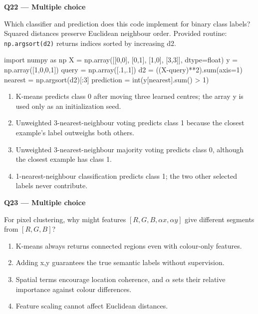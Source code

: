 \documentclass[11pt,a4paper]{article}
\begin{document}
\begin{minipage}{\linewidth}
\textbf{Q22 — Multiple choice}\par\smallskip
Which classifier and prediction does this code implement for binary class labels? Squared distances preserve Euclidean neighbour order. Provided routine: \texttt{np.argsort(d2)} returns indices sorted by increasing d2.


\begin{Code}
import numpy as np
X = np.array([[0,0], [0,1], [1,0], [3,3]], dtype=float)
y = np.array([1,0,0,1])
query = np.array([.1,.1])
d2 = ((X-query)**2).sum(axis=1)
nearest = np.argsort(d2)[:3]
prediction = int(y[nearest].sum() > 1)
\end{Code}

\begin{enumerate}[label=\textbf{\Alph*.}]
\item K-means predicts class 0 after moving three learned centres; the array y is used only as an initialization seed.
\item Unweighted 3-nearest-neighbour voting predicts class 1 because the closest example's label outweighs both others.
\item Unweighted 3-nearest-neighbour majority voting predicts class 0,\allowbreak{} although the closest example has class 1.
\item 1-nearest-neighbour classification predicts class 1; the two other selected labels never contribute.
\end{enumerate}
\end{minipage}
\par\vspace{12pt}
\begin{minipage}{\linewidth}
\textbf{Q23 — Multiple choice}\par\smallskip
For pixel clustering,\allowbreak{} why might features \([R,G,B,\alpha x,\alpha y]\) give different segments from \([R,G,B]\)?
\begin{enumerate}[label=\textbf{\Alph*.}]
\item K-means always returns connected regions even with colour-only features.
\item Adding x,\allowbreak{}y guarantees the true semantic labels without supervision.
\item Spatial terms encourage location coherence,\allowbreak{} and \(\alpha\) sets their relative importance against colour differences.
\item Feature scaling cannot affect Euclidean distances.
\end{enumerate}
\end{minipage}
\end{document}
